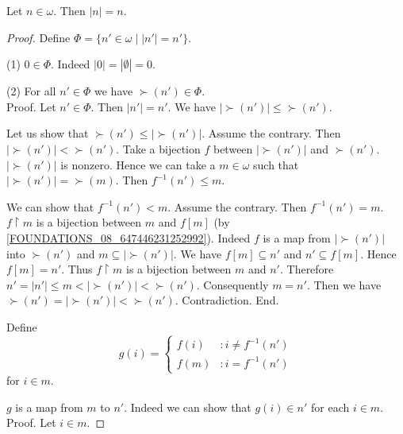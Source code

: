 \documentclass[../set-theory.tex]{subfiles}
\begin{document}
  \begin{forthel}
    \begin{theorem}
      Let $n \in \omega$.
      Then $|n| = n$.
    \end{theorem}
    \begin{proof}
      Define $\Phi = \{ n' \in \omega \mid |n'| = n' \}$.

      (1) $0 \in \Phi$.
      Indeed $|0| = |\emptyset| = 0$.

      (2) For all $n' \in \Phi$ we have $\succ(n') \in \Phi$. \\
      Proof.
        Let $n' \in \Phi$.
        Then $|n'| = n'$.
        We have $|\succ(n')| \leq \succ(n')$.

        Let us show that $\succ(n') \leq |\succ(n')|$.
          Assume the contrary.
          Then $|\succ(n')| < \succ(n')$.
          Take a bijection $f$ between $|\succ(n')|$ and $\succ(n')$.
          $|\succ(n')|$ is nonzero.
          Hence we can take a $m \in \omega$ such that $|\succ(n')| =
          \succ(m)$.
          Then $f^{-1}(n') \leq m$.

          We can show that $f^{-1}(n') < m$.
            Assume the contrary.
            Then $f^{-1}(n') = m$.
            $f \restriction m$ is a bijection between $m$ and $f[m]$ (by
            \cref{FOUNDATIONS_08_647446231252992}).
            Indeed $f$ is a map from $|\succ(n')|$ into $\succ(n')$ and
            $m \subseteq |\succ(n')|$.
            We have $f[m] \subseteq n'$ and $n' \subseteq f[m]$.
            Hence $f[m] = n'$.
            Thus $f \restriction m$ is a bijection between $m$ and $n'$.
            Therefore $n'
              = |n'|
              \leq m
              < |\succ(n')|
              < \succ(n')$.
            Consequently $m = n'$.
            Then we have $\succ(n') = |\succ(n')| < \succ(n')$.
            Contradiction.
          End.

          Define \[ g(i) =
            \begin{cases}
              f(i)  & : i \neq f^{-1}(n')
              \\
              f(m)  & : i = f^{-1}(n')
            \end{cases} \]
          for $i \in m$.

          $g$ is a map from $m$ to $n'$.
          Indeed we can show that $g(i) \in n'$ for each $i \in m$. \\
          Proof.
            Let $i \in m$.


\end{proof}
\end{forthel}
\end{document}
